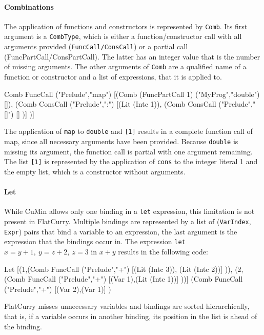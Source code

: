 \documentclass[fleqn]{scrreprt}
\newcommand{\coqinline}[1]{\texttt{#1}}
\begin{document}
\paragraph{Combinations}
The application of functions and constructors is represented by \coqinline{Comb}. Its first argument is a \coqinline{CombType}, which is either a function/constructor call with all arguments provided (\coqinline{FuncCall/ConsCall}) or a partial call (FuncPartCall/ConsPartCall). The latter has an integer value that is the number of missing arguments. The other arguments of \coqinline{Comb} are a qualified name of a function or constructor and a list of expressions, that it is applied to.
\begin{coqcode}
Comb FuncCall ("Prelude","map") 
     [(Comb (FuncPartCall 1) ("MyProg","double") []),
      (Comb ConsCall ("Prelude",":") [(Lit (Intc 1)),
                                      (Comb ConsCall ("Prelude","[]") [] )] )]
\end{coqcode}
The application of \texttt{map} to \texttt{double} and \texttt{[1]} results in a complete function call of map, since all necessary arguments have been provided. Because \texttt{double} is missing its argument, the function call is partial with one argument remaining. The list \texttt{[1]} is represented by the application of \texttt{cons} to the integer literal 1 and the empty list, which is a constructor without arguments.
\paragraph{Let}
While CuMin allows only one binding in a \texttt{let} expression, this limitation is not present in FlatCurry. Multiple bindings are represented by a list of (\coqinline{VarIndex}, \coqinline{Expr}) pairs that bind a variable to an expression, the last argument is the expression that the bindings occur in. The expression \texttt{let} $x = y + 1,\: y = z + 2,\: z = 3$ in $x + y$ results in the following code:
\begin{coqcode}
Let [(1,(Comb FuncCall ("Prelude","+") [(Lit (Intc 3)), (Lit (Intc 2))] )),
     (2,(Comb FuncCall ("Prelude","+") [(Var 1),(Lit (Intc 1))] ))]
    (Comb FuncCall ("Prelude","+") [(Var 2),(Var 1)] )
\end{coqcode}
FlatCurry misses unnecessary variables and bindings are sorted hierarchically, that is, if a variable occurs in another binding, its position in the list is ahead of the binding.
\end{document}
